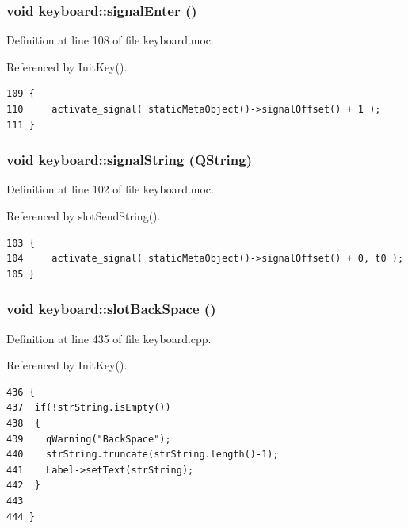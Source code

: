\subsubsection{\setlength{\rightskip}{0pt plus 5cm}void keyboard::signal\-Enter ()\hspace{0.3cm}{\tt  [signal]}}\label{classkeyboard_keyboardl1}




Definition at line 108 of file keyboard.moc.

Referenced by Init\-Key().



\footnotesize\begin{verbatim}109 {
110     activate_signal( staticMetaObject()->signalOffset() + 1 );
111 }
\end{verbatim}\normalsize 
{}
\subsubsection{\setlength{\rightskip}{0pt plus 5cm}void keyboard::signal\-String (QString)\hspace{0.3cm}{\tt  [signal]}}\label{classkeyboard_keyboardl0}




Definition at line 102 of file keyboard.moc.

Referenced by slot\-Send\-String().



\footnotesize\begin{verbatim}103 {
104     activate_signal( staticMetaObject()->signalOffset() + 0, t0 );
105 }
\end{verbatim}\normalsize 
{}
\subsubsection{\setlength{\rightskip}{0pt plus 5cm}void keyboard::slot\-Back\-Space ()\hspace{0.3cm}{\tt  [slot]}}\label{classkeyboard_keyboardi4}




Definition at line 435 of file keyboard.cpp.

Referenced by Init\-Key().



\footnotesize\begin{verbatim}436 {
437  if(!strString.isEmpty())
438  {
439    qWarning("BackSpace");
440    strString.truncate(strString.length()-1);
441    Label->setText(strString);
442  }
443  
444 }
\end{verbatim}\normalsize 
{}
